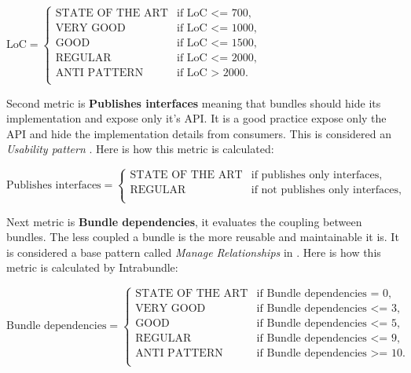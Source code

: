 \(\text{LoC}=\begin{cases}
\text{STATE OF THE ART}& \text{if LoC <= 700},\\
\text{VERY GOOD}& \text{if LoC <= 1000}, \\
\text{GOOD}& \text{if LoC <= 1500}, \\
\text{REGULAR}& \text{if LoC <= 2000}, \\
\text{ANTI PATTERN}& \text{if LoC > 2000}. \\
\end{cases} \)\newline  

Second metric is \textbf{Publishes interfaces} meaning that bundles should hide its implementation and expose only it's API. It is a good practice expose only the API and hide the implementation details from consumers. This is considered an \emph{Usability pattern} \citep{Knoernschild 2012}. Here is how this metric is calculated:\newline

\(\text{Publishes interfaces}=\begin{cases}
\text{STATE OF THE ART}& \text{if publishes only interfaces},\\
\text{REGULAR}& \text{if not publishes only interfaces}, \\
\end{cases} \)  \newline

Next metric is \textbf{Bundle dependencies}, it evaluates the coupling between bundles. The less coupled a bundle is the more reusable and maintainable it is. It is considered a base pattern called \emph{Manage Relationships} in \citep{Knoernschild 2012}. Here is how this metric is calculated by Intrabundle:\newline


\(\text{Bundle dependencies}=\begin{cases}
\text{STATE OF THE ART}& \text{if Bundle dependencies = 0},\\
\text{VERY GOOD}& \text{if Bundle dependencies <= 3}, \\
\text{GOOD}& \text{if Bundle dependencies <= 5}, \\
\text{REGULAR}& \text{if Bundle dependencies <= 9}, \\
\text{ANTI PATTERN}& \text{if Bundle dependencies >= 10}. \\
\end{cases} \)\newline 

